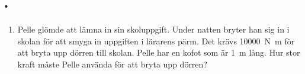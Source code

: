 \documentclass[11pt]{article}
\begin{document}
\raggedright

\section*{\lessonNumber. \lessonName}
\begin{enumerate}[itemsep=2em]
        \item
              \begin{minipage}[t]{0.5\textwidth}
                      Pelle glömde att lämna in sin skoluppgift.
                      Under natten bryter han sig in i skolan för att smyga in uppgiften i lärarens pärm. Det krävs \SI{10 000}{\newton\meter} för att bryta upp dörren till skolan. Pelle har en kofot som är \SI{1}{\meter} lång. Hur stor kraft måste Pelle använda för att bryta upp dörren?
              \end{minipage}

\end{enumerate}
\end{document}
